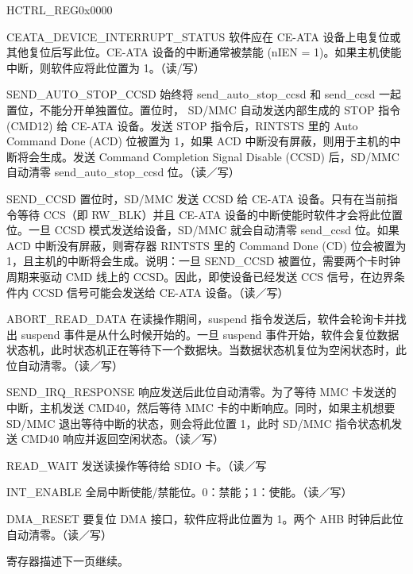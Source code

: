 \begin{register}{H}{CTRL\_REG}{0x0000}\label{regdesc:CTRLREG}
%
%
%
%
%
%
%
%
%
%
%
%
%
%
%
\regnewline%
\begin{regdesc}\begin{reglist}
\item [CEATA\_DEVICE\_INTERRUPT\_STATUS]软件应在 CE-ATA 设备上电复位或其他复位后写此位。CE-ATA 设备的中断通常被禁能 (nIEN = 1)。如果主机使能中断，则软件应将此位置为 1。（读/写）
\item [SEND\_AUTO\_STOP\_CCSD]始终将 send\_auto\_stop\_ccsd 和 send\_ccsd 一起置位，不能分开单独置位。置位时， SD/MMC 自动发送内部生成的 STOP 指令 (CMD12) 给 CE-ATA 设备。发送 STOP 指令后，RINTSTS 里的 Auto Command Done (ACD) 位被置为 1，如果 ACD 中断没有屏蔽，则用于主机的中断将会生成。发送 Command Completion Signal Disable (CCSD) 后，SD/MMC 自动清零 send\_auto\_stop\_ccsd 位。（读／写）
\item [SEND\_CCSD]置位时，SD/MMC 发送 CCSD 给 CE-ATA 设备。只有在当前指令等待 CCS（即 RW\_BLK）并且 CE-ATA 设备的中断使能时软件才会将此位置位。一旦 CCSD 模式发送给设备，SD/MMC 就会自动清零 send\_ccsd 位。如果 ACD 中断没有屏蔽，则寄存器 RINTSTS 里的 Command Done (CD) 位会被置为 1，且主机的中断将会生成。说明：一旦 SEND\_CCSD 被置位，需要两个卡时钟周期来驱动 CMD 线上的 CCSD。因此，即使设备已经发送 CCS 信号，在边界条件内 CCSD 信号可能会发送给 CE-ATA 设备。（读／写）
\item [ABORT\_READ\_DATA]在读操作期间，suspend 指令发送后，软件会轮询卡并找出 suspend 事件是从什么时候开始的。一旦 suspend 事件开始，软件会复位数据状态机，此时状态机正在等待下一个数据块。当数据状态机复位为空闲状态时，此位自动清零。（读／写）
\item [SEND\_IRQ\_RESPONSE]响应发送后此位自动清零。为了等待 MMC 卡发送的中断，主机发送 CMD40，然后等待 MMC 卡的中断响应。同时，如果主机想要 SD/MMC 退出等待中断的状态，则会将此位置 1，此时 SD/MMC 指令状态机发送 CMD40 响应并返回空闲状态。（读／写）
\item [READ\_WAIT]发送读操作等待给 SDIO 卡。（读／写
\item [INT\_ENABLE]全局中断使能/禁能位。0：禁能；1：使能。（读／写）
\item [DMA\_RESET]要复位 DMA 接口，软件应将此位置为 1。两个 AHB 时钟后此位自动清零。（读／写）
\item [寄存器描述下一页继续。]
\end{reglist}\end{regdesc}
\end{register}
